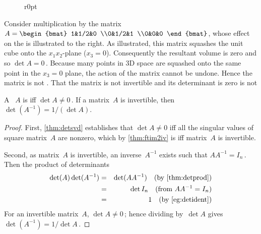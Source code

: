 \begin{wrapfigure}[5]r{0pt} 
\end{wrapfigure}
\begin{example} \label{eg:detzerorow}
Consider multiplication by the matrix 
\(A=\begin{bmat} 1&1/2&0
\\0&1/2&1 \\0&0&0 \end{bmat}\),
whose effect on the  is illustrated to the right.
As illustrated, this matrix squashes the unit cube onto the \(x_1x_2\)-plane (\(x_3=0\)).
Consequently the resultant volume is zero and so \(\det A=0\)\,.
Because many points in 3D space are squashed onto the same point in the \(x_3=0\) plane, the action of the matrix cannot be undone.  
Hence the matrix is not . 
That the matrix is not invertible and its determinant is zero is not 
\end{example}


\begin{theorem} \label{thm:detinv} 
A ~\(A\) is  iff \(\det A\neq 0\)\,.
If a matrix~\(A\) is invertible, then \(\det(A^{-1})=1/(\det A)\).
\end{theorem}
\begin{proof} 
First, \cref{thm:detsvd} establishes that \(\det A\neq 0\) iff all the singular values of square matrix~\(A\) are nonzero, which by \cref{thm:ftim2iv} is iff matrix~\(A\) is invertible.

Second, as matrix~\(A\) is invertible, an inverse~\(A^{-1}\) exists such that \(AA^{-1}=I_n\)\,.
Then the product of determinants
\begin{eqnarray*}
\det(A)\det(A^{-1})
&=&\det(AA^{-1}) \quad(\text{by \cref{thm:detprod}})
\\&=&\det I_n\quad(\text{from }AA^{-1}=I_n)
\\&=&1\quad(\text{by \cref{eg:detident}})
\end{eqnarray*}
For an invertible matrix~\(A\), \(\det A\neq 0\)\,; hence
dividing by~\(\det A\) gives \(\det(A^{-1})=1/\det A\)\,.
\end{proof}






\sectionExercises



